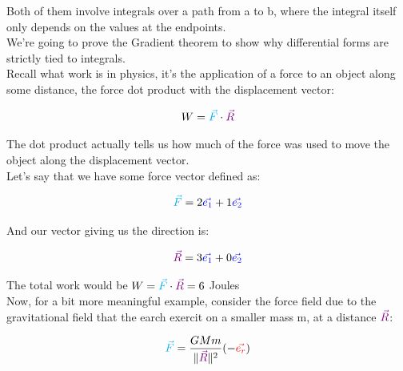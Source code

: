 Both of them involve integrals over a path from a to b, where the integral itself 
only depends on the values at the endpoints.\\
We're going to prove the Gradient theorem to show why differential forms are strictly tied to integrals.\\

Recall what work is in physics, it's the application of a force to an object along some distance, the force dot 
product with the displacement vector:

\begin{equation}
    W = \begingroup\color{cyan}\vec{F}\endgroup \cdot \begingroup\color{violet}\vec{R}\endgroup
\end{equation}

The dot product actually tells us how much of the force was used to move the object along the displacement vector.\\
Let's say that we have some force vector defined as:

\begin{equation}
    \begingroup\color{cyan}\vec{F}\endgroup = 2\begingroup\color{blue}\vec{e_1}\endgroup + 1\begingroup\color{blue}\vec{e_2}\endgroup
\end{equation}

\begin{center}

\end{center}

And our vector giving us the direction is:

\begin{equation}
    \begingroup\color{violet}\vec{R}\endgroup = 3\begingroup\color{blue}\vec{e_1}\endgroup + 0\begingroup\color{blue}\vec{e_2}\endgroup
\end{equation}

The total work would be $W = \begingroup\color{cyan}\vec{F}\endgroup \cdot \begingroup\color{violet}\vec{R}\endgroup = 6$ Joules\\

Now, for a bit more meaningful example, consider the force field due to the gravitational field that the 
earch exercit on a smaller mass m, at a distance $\begingroup\color{violet}\vec{R}\endgroup$:

\begin{equation}
    \begingroup\color{cyan}\vec{F}\endgroup = \frac{GMm}{\|\begingroup\color{violet}\vec{R}\endgroup\|^2} (-\begingroup\color{red}\vec{e_r}\endgroup)
\end{equation}

